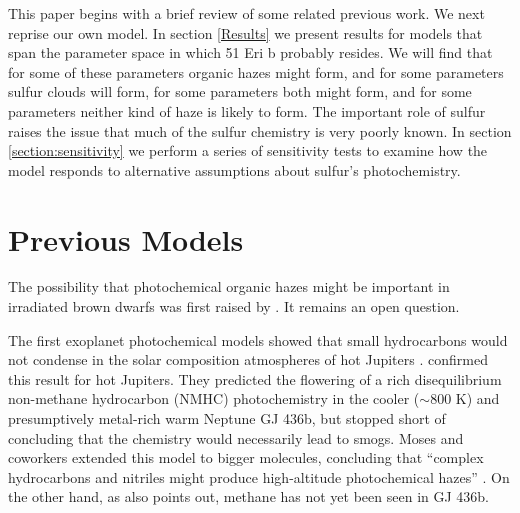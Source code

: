 \documentclass[preprint]{aastex6}
\begin{document}
This paper begins with a brief review of some related previous work.
We next reprise our own model.
In section \ref{Results} we present results for models that span
 the parameter space in which 51 Eri b probably resides.
 We will find that for some of these parameters organic hazes might form, and for some parameters sulfur clouds will form,
 for some parameters both might form, and for some parameters neither kind of haze is likely to form.
 The important role of sulfur raises the issue that much of the sulfur chemistry is very poorly known.
 In section \ref{section:sensitivity} we perform a series of sensitivity tests to examine how the model responds to alternative
 assumptions about sulfur's photochemistry.

\section{Previous Models}

The possibility that photochemical organic hazes might be important in irradiated brown dwarfs was first raised by \citet{Griffith1998}.
It remains an open question.

The first exoplanet photochemical models showed that small hydrocarbons would not condense 
in the solar composition atmospheres of hot Jupiters \citep{Liang2003,Liang2004}.
\citet{Line2010,Line2011} confirmed this result for hot Jupiters. 
They predicted the flowering of a rich disequilibrium non-methane hydrocarbon (NMHC) photochemistry
in the cooler ($\sim 800$ K) and presumptively metal-rich warm Neptune GJ 436b,
but stopped short of concluding that the chemistry would necessarily lead to smogs. 
Moses and coworkers \citep{Moses2011,Visscher2011,Moses2013a,Moses2013b,Moses2014} 
extended this model to bigger molecules, concluding   
that  ``complex hydrocarbons and nitriles might produce high-altitude photochemical hazes'' \citep{Moses2014}.
 On the other hand, as \citet{Moses2014} also points out, methane has not yet been seen in GJ 436b.
\end{document}
